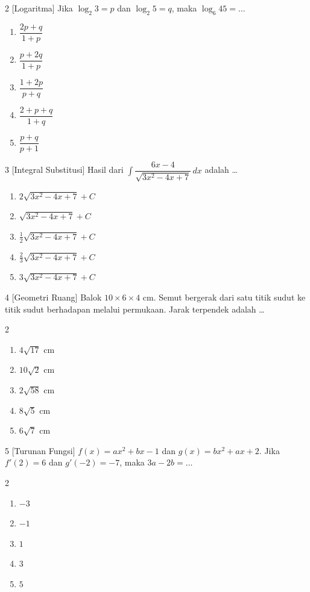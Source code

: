 \documentclass[11pt]{article}
\newenvironment{pil}{%
  \begin{enumerate}[label=(\alph*),leftmargin=*,itemsep=1pt,topsep=3pt]}%
  {\end{enumerate}}
\newenvironment{pilB}{%
  \par\smallskip\begin{multicols}{2}
  \begin{enumerate}[label=(\alph*),leftmargin=*,itemsep=1pt,topsep=3pt]}%
  {\end{enumerate}\end{multicols}}
\begin{document}
\begin{soal}{2 \normalfont\small[Logaritma]}
Jika $\log_2 3=p$ dan $\log_2 5=q$, maka $\log_6 45=\ldots$
\begin{pil}
  \item $\dfrac{2p+q}{1+p}$ \item $\dfrac{p+2q}{1+p}$
  \item $\dfrac{1+2p}{p+q}$ \item $\dfrac{2+p+q}{1+q}$ \item $\dfrac{p+q}{p+1}$
\end{pil}
\end{soal}

\begin{soal}{3 \normalfont\small[Integral Substitusi]}
Hasil dari $\displaystyle\int\dfrac{6x-4}{\sqrt{3x^2-4x+7}}\,dx$ adalah \ldots
\begin{pil}
  \item $2\sqrt{3x^2-4x+7}+C$
  \item $\sqrt{3x^2-4x+7}+C$
  \item $\tfrac{1}{2}\sqrt{3x^2-4x+7}+C$
  \item $\tfrac{2}{3}\sqrt{3x^2-4x+7}+C$
  \item $3\sqrt{3x^2-4x+7}+C$
\end{pil}
\end{soal}

\begin{soal}{4 \normalfont\small[Geometri Ruang]}
Balok $10\times6\times4$ cm. Semut bergerak dari satu titik sudut ke titik sudut berhadapan melalui permukaan. Jarak terpendek adalah \ldots
\begin{pilB}
  \item $4\sqrt{17}$ cm \item $10\sqrt{2}$ cm \item $2\sqrt{58}$ cm \item $8\sqrt{5}$ cm \item $6\sqrt{7}$ cm
\end{pilB}
\end{soal}

\begin{soal}{5 \normalfont\small[Turunan Fungsi]}
$f(x)=ax^2+bx-1$ dan $g(x)=bx^2+ax+2$. Jika $f'(2)=6$ dan $g'(-2)=-7$, maka $3a-2b=\ldots$
\begin{pilB}
  \item $-3$ \item $-1$ \item $1$ \item $3$ \item $5$
\end{pilB}
\end{soal}
\end{document}
